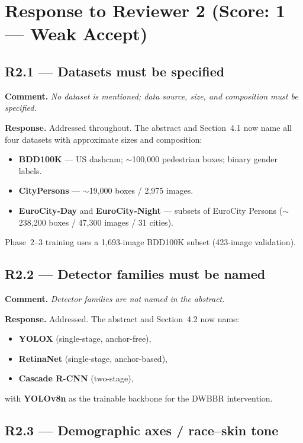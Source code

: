\documentclass[11pt]{article}
\begin{document}
\section*{Response to Reviewer 2 (Score: 1 --- Weak Accept)}

\subsection*{R2.1 --- Datasets must be specified}

\textbf{Comment.}
\textit{No dataset is mentioned; data source, size, and composition must be
specified.}

\textbf{Response.}
Addressed throughout. The abstract and Section~4.1 now name all four datasets
with approximate sizes and composition:
\begin{itemize}
\item \textbf{BDD100K} --- US dashcam; $\sim$100{,}000 pedestrian boxes; binary
      gender labels.
\item \textbf{CityPersons} --- $\sim$19{,}000 boxes / 2{,}975 images.
\item \textbf{EuroCity-Day} and \textbf{EuroCity-Night} --- subsets of EuroCity
      Persons ($\sim$238{,}200 boxes / 47{,}300 images / 31 cities).
\end{itemize}
Phase~2--3 training uses a 1{,}693-image BDD100K subset (423-image validation).

\subsection*{R2.2 --- Detector families must be named}

\textbf{Comment.}
\textit{Detector families are not named in the abstract.}

\textbf{Response.}
Addressed. The abstract and Section~4.2 now name:
\begin{itemize}
\item \textbf{YOLOX} (single-stage, anchor-free),
\item \textbf{RetinaNet} (single-stage, anchor-based),
\item \textbf{Cascade R-CNN} (two-stage),
\end{itemize}
with \textbf{YOLOv8n} as the trainable backbone for the DWBBR intervention.

\subsection*{R2.3 --- Demographic axes / race--skin tone}
\end{document}
